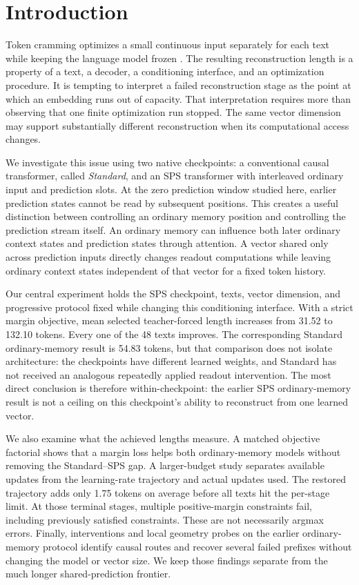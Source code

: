 \documentclass{article}
\begin{document}
\section{Introduction}
\label{sec:intro}

Token cramming optimizes a small continuous input separately for each text while keeping the language model frozen \citep{kuratov2025cramming}.
The resulting reconstruction length is a property of a text, a decoder, a conditioning interface, and an optimization procedure.
It is tempting to interpret a failed reconstruction stage as the point at which an embedding runs out of capacity.
That interpretation requires more than observing that one finite optimization run stopped.
The same vector dimension may support substantially different reconstruction when its computational access changes.

We investigate this issue using two native checkpoints: a conventional causal transformer, called \emph{Standard}, and an SPS transformer with interleaved ordinary input and prediction slots.
At the zero prediction window studied here, earlier prediction states cannot be read by subsequent positions.
This creates a useful distinction between controlling an ordinary memory position and controlling the prediction stream itself.
An ordinary memory can influence both later ordinary context states and prediction states through attention.
A vector shared only across prediction inputs directly changes readout computations while leaving ordinary context states independent of that vector for a fixed token history.

Our central experiment holds the SPS checkpoint, texts, vector dimension, and progressive protocol fixed while changing this conditioning interface.
With a strict margin objective, mean selected teacher-forced length increases from 31.52 to 132.10 tokens.
Every one of the 48 texts improves.
The corresponding Standard ordinary-memory result is 54.83 tokens, but that comparison does not isolate architecture: the checkpoints have different learned weights, and Standard has not received an analogous repeatedly applied readout intervention.
The most direct conclusion is therefore within-checkpoint: the earlier SPS ordinary-memory result is not a ceiling on this checkpoint's ability to reconstruct from one learned vector.

We also examine what the achieved lengths measure.
A matched objective factorial shows that a margin loss helps both ordinary-memory models without removing the Standard--SPS gap.
A larger-budget study separates available updates from the learning-rate trajectory and actual updates used.
The restored trajectory adds only 1.75 tokens on average before all texts hit the per-stage limit.
At those terminal stages, multiple positive-margin constraints fail, including previously satisfied constraints.
These are not necessarily argmax errors.
Finally, interventions and local geometry probes on the earlier ordinary-memory protocol identify causal routes and recover several failed prefixes without changing the model or vector size.
We keep those findings separate from the much longer shared-prediction frontier.
\end{document}
